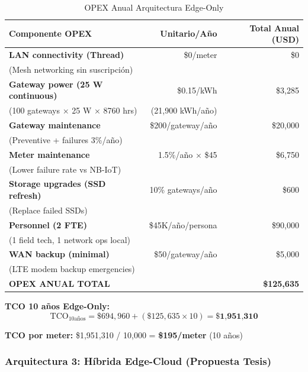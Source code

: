 \begin{table}[H]
\centering
\caption{OPEX Anual Arquitectura Edge-Only}
\label{tab:opex-edge-only}
\small
\begin{tabular}{|p{5.5cm}|r|r|}
\hline
\rowcolor{green!20}
\textbf{Componente OPEX} & \textbf{Unitario/Año} & \textbf{Total Anual (USD)} \\
\hline
\textbf{LAN connectivity (Thread)} & \$0/meter & \$0 \\
(Mesh networking sin suscripción) & & \\
\hline
\textbf{Gateway power (25 W continuous)} & \$0.15/kWh & \$3,285 \\
(100 gateways $\times$ 25 W $\times$ 8760 hrs) & (21,900 kWh/año) & \\
\hline
\textbf{Gateway maintenance} & \$200/gateway/año & \$20,000 \\
(Preventive + failures 3\%/año) & & \\
\hline
\textbf{Meter maintenance} & 1.5\%/año $\times$ \$45 & \$6,750 \\
(Lower failure rate vs NB-IoT) & & \\
\hline
\textbf{Storage upgrades (SSD refresh)} & 10\% gateways/año & \$600 \\
(Replace failed SSDs) & & \\
\hline
\textbf{Personnel (2 FTE)} & \$45K/año/persona & \$90,000 \\
(1 field tech, 1 network ops local) & & \\
\hline
\textbf{WAN backup (minimal)} & \$50/gateway/año & \$5,000 \\
(LTE modem backup emergencies) & & \\
\hline
\rowcolor{gray!20}
\textbf{OPEX ANUAL TOTAL} & & \textbf{\$125,635} \\
\hline
\end{tabular}
\end{table}

\textbf{TCO 10 años Edge-Only:}
\begin{equation}
\text{TCO}_{10\text{años}} = \$694,960 + (\$125,635 \times 10) = \textbf{\$1,951,310}
\end{equation}

\textbf{TCO por meter:} \$1,951,310 / 10,000 = \textbf{\$195/meter} (10 años)

\subsubsection{Arquitectura 3: Híbrida Edge-Cloud (Propuesta Tesis)}

